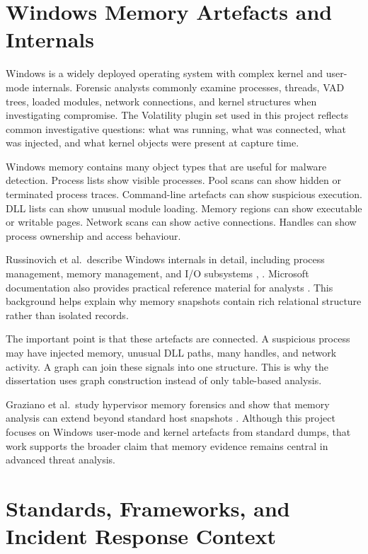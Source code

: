 \section{Windows Memory Artefacts and Internals}

Windows is a widely deployed operating system with complex kernel and user-mode internals. Forensic analysts commonly examine processes, threads, VAD trees, loaded modules, network connections, and kernel structures when investigating compromise. The Volatility plugin set used in this project reflects common investigative questions: what was running, what was connected, what was injected, and what kernel objects were present at capture time.

Windows memory contains many object types that are useful for malware detection. Process lists show visible processes. Pool scans can show hidden or terminated process traces. Command-line artefacts can show suspicious execution. DLL lists can show unusual module loading. Memory regions can show executable or writable pages. Network scans can show active connections. Handles can show process ownership and access behaviour.

Russinovich et al.\ describe Windows internals in detail, including process management, memory management, and I/O subsystems \cite{russinovich2017internals1}, \cite{russinovich2021internals2}. Microsoft documentation also provides practical reference material for analysts \cite{microsoft2026windowsinternals}. This background helps explain why memory snapshots contain rich relational structure rather than isolated records.

The important point is that these artefacts are connected. A suspicious process may have injected memory, unusual DLL paths, many handles, and network activity. A graph can join these signals into one structure. This is why the dissertation uses graph construction instead of only table-based analysis.

Graziano et al.\ study hypervisor memory forensics and show that memory analysis can extend beyond standard host snapshots \cite{graziano2013hypervisor}. Although this project focuses on Windows user-mode and kernel artefacts from standard dumps, that work supports the broader claim that memory evidence remains central in advanced threat analysis.

\section{Standards, Frameworks, and Incident Response Context}

